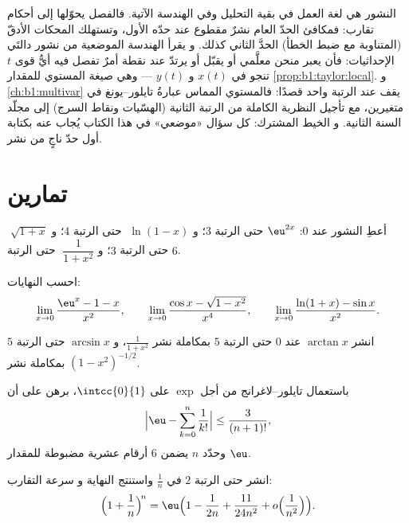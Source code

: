 \begin{remark}
النشور هي لغة العمل في بقية التحليل
وفي الهندسة الآتية. فالفصل  يحوّلها
إلى أحكام تقارب: فمكافئ الحدّ العام
نشرٌ مقطوع عند حدّه الأول، وتستهلك المحكات الأدقّ
(المتناوبة مع ضبط الخطأ) الحدَّ الثاني كذلك.
و  يقرأ الهندسة الموضعية من نشور
دالتَي الإحداثيات: فأن يعبر منحن معلَّمي أو يقبّل أو
يرتدّ عند نقطة أمرٌ تفصل فيه أيُّ قوى $t$
تنجو في $x(t)$ و $y(t)$ --- وهي صيغة المستوي للمقدار
\cref{prop:b1:taylor:local}. و \cref{ch:b1:multivar} يقف عند
الرتبة واحد قصدًا: فالمستوي المماس عبارةُ
تايلور--يونغ في متغيرين، مع تأجيل النظرية الكاملة من الرتبة الثانية
(الهسّيات ونقاط السرج) إلى مجلّد السنة الثانية. و
الخيط المشترك: كل سؤال «موضعي» في هذا الكتاب يُجاب عنه
بكتابة أول حدّ ناجٍ من نشر.
\end{remark}

\section{تمارين}

\begin{exercise}[$\star$]\label{exo:b1:taylor:1}
أعطِ النشور عند $0$: $\eu^{2x}$ حتى الرتبة $3$؛
و $\;\ln(1 - x)$ حتى الرتبة $4$؛ و $\;\sqrt{1 + x}$ حتى الرتبة $3$؛
و $\;\dfrac{1}{1 + x^2}$ حتى الرتبة $6$.
\end{exercise}

\begin{exercise}[$\star$]\label{exo:b1:taylor:2}
احسب النهايات:
\[
\lim_{x\to 0} \frac{\eu^x - 1 - x}{x^2},
\qquad
\lim_{x\to 0} \frac{\cos x - \sqrt{1 - x^2}}{x^4},
\qquad
\lim_{x\to 0} \frac{\ln(1+x) - \sin x}{x^2}.
\]
\end{exercise}

\begin{exercise}[$\star$]\label{exo:b1:taylor:3}
انشر $\arctan x$ عند $0$ حتى الرتبة $5$ بمكاملة نشر
$\frac{1}{1 + x^2}$، و $\arcsin x$ حتى الرتبة $5$ بمكاملة
نشر $(1 - x^2)^{-1/2}$.
\end{exercise}

\begin{exercise}[$\star$]\label{exo:b1:taylor:4}
باستعمال تايلور--لاغرانج من أجل $\exp$ على $\intcc{0}{1}$، برهن على أن
\[
\Bigl| \eu - \sum_{k=0}^{n} \frac{1}{k!} \Bigr| \leq
\frac{3}{(n+1)!},
\]
وحدّد $n$ يضمن $6$ أرقام عشرية مضبوطة للمقدار $\eu$.
\end{exercise}

\begin{exercise}[$\star\star$]\label{exo:b1:taylor:5}
انشر حتى الرتبة $2$ في $\frac1n$ واستنتج النهاية و
سرعة التقارب:
\[
\Bigl(1 + \frac 1n\Bigr)^{\!n}
= \eu\Bigl(1 - \frac{1}{2n} + \frac{11}{24n^2} +
o\Bigl(\frac{1}{n^2}\Bigr)\Bigr).
\]
\end{exercise}

